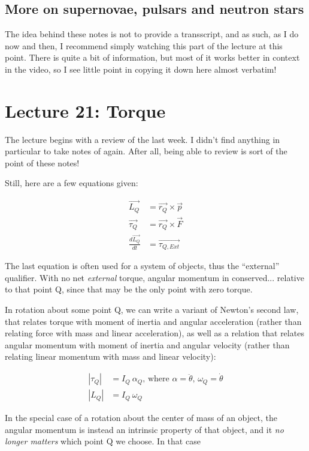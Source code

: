 \documentclass[12pt,a4paper]{report}
\begin{document}
\subsection{More on supernovae, pulsars and neutron stars}

The idea behind these notes is not to provide a transscript, and as such, as I do now and then, I recommend simply watching this part of the lecture at this point. There is quite a bit of information, but most of it works better in context in the video, so I see little point in copying it down here almost verbatim!

\section{Lecture 21: Torque}

The lecture begins with a review of the last week. I didn't find anything in particular to take notes of again. After all, being able to review is sort of the point of these notes!

Still, here are a few equations given:

\begin{align}
\vec{L_Q} &= \vec{r_Q} \times \vec{p}\\
\vec{\tau_Q} &= \vec{r_Q} \times \vec{F}\\
\frac{d\vec{L_Q}}{dt} &= \vec{\tau_{Q,Ext}}
\end{align}

The last equation is often used for a system of objects, thus the ``external'' qualifier. With no net \emph{external} torque, angular momentum in conserved... relative to that point Q, since that may be the only point with zero torque.

In rotation about some point Q, we can write a variant of Newton's second law, that relates torque with moment of inertia and angular acceleration (rather than relating force with mass and linear acceleration), as well as a relation that relates angular momentum with moment of inertia and angular velocity (rather than relating linear momentum with mass and linear velocity):

\begin{align}
|\tau_Q| &= I_Q\ \alpha_Q \text{, where $\alpha = \ddot{\theta}$, $\omega_Q = \dot{\theta}$}\\
|L_Q|    &= I_Q\ \omega_Q
\end{align}

In the special case of a rotation about the center of mass of an object, the angular momentum is instead an intrinsic property of that object, and it \emph{no longer matters} which point Q we choose. In that case
\end{document}

